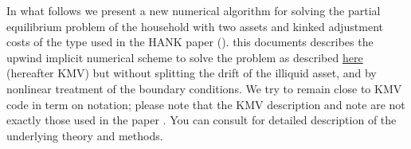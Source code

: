 \documentclass[11pt]{article}
\author{Soroush}
\date{\today}
\title{}
\begin{document}
\tableofcontents

\newpage
In what follows we present a new numerical algorithm for solving the partial equilibrium problem of the household with two assets and kinked adjustment costs of the type used in the HANK paper (\cite{kaplan2018monetary}). this documents describes the upwind implicit numerical scheme to solve the problem as described \href{http://benjaminmoll.com/wp-content/uploads/2020/06/two_asset_kinked.pdf}{here} (hereafter KMV) but without splitting the drift of the illiquid asset, and by nonlinear treatment of the boundary conditions. We try to remain close to KMV code in term on notation; please note that the KMV description and note are not exactly those used in the paper \cite{kaplan2018monetary}. You can consult \cite{achdou2022income} for detailed description of the underlying theory and methods.
\end{document}
